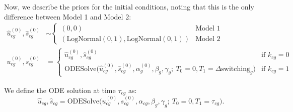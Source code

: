 \documentclass[
  sn-mathphys-num,
  lineno,
  twocolumn]{sn-jnl}
\begin{document}
Now, we describe the priors for the initial conditions, noting that this
is the only difference between Model 1 and Model 2: \begin{align}
  \hat{u}^{(0)}_{cg}, \hat{s}^{(0)}_{cg} &\sim \begin{cases}
    (0, 0) & \text{Model 1} \\
    (\text{LogNormal}(0, 1), \text{LogNormal}(0, 1)) & \text{Model 2}
  \end{cases} \\
  u^{(0)}_{cg}, s^{(0)}_{cg} &= \begin{cases}
    \hat{u}^{(0)}_{cg}, \hat{s}^{(0)}_{cg} & \text{if } k_{cg} = 0 \\
    \textrm{ODESolve}\Big( \hat{u}^{(0)}_{cg}, \hat{s}^{(0)}_{cg}, \alpha^{(0)}_g, \beta_g, \gamma_g; \ T_0=0, T_1=\Delta \textrm{switching}_g \Big) & \text{if } k_{cg} = 1
  \end{cases}
\end{align}

We define the ODE solution at time \(\tau_{cg}\) as: \begin{equation}
    \hat{u}_{cg}, \hat{s}_{cg} = \text{ODESolve}\Big( u^{(0)}_{cg}, s^{(0)}_{cg}, \alpha_{cg}, \beta_g, \gamma_g; \ T_0=0, T_1=\tau_{cg} \Big).
\end{equation}
\end{document}
